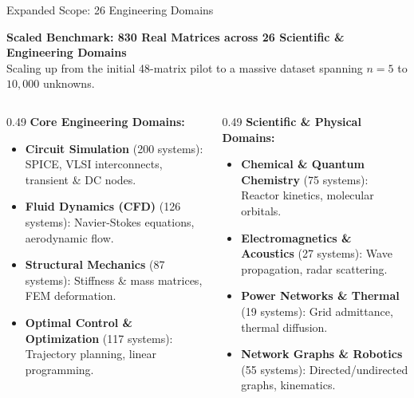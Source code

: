 \documentclass[aspectratio=169,10pt]{beamer}
\begin{document}
\begin{frame}{Expanded Scope: 26 Engineering Domains}
  \vspace{-0.15em}
  \colorbox{LSlightgold}{\parbox{0.98\linewidth}{\vspace{0.25em}
    {\bfseries\normalsize\color{LSnavy} Scaled Benchmark: 830 Real Matrices across 26 Scientific \& Engineering Domains}\\[0.18em]
    {\footnotesize\color{LSgray} Scaling up from the initial 48-matrix pilot to a massive dataset spanning $n = 5$ to $10{,}000$ unknowns.}
    \vspace{0.25em}}}
  \vspace{0.35em}

  \small
  \begin{columns}[T]
    \begin{column}{0.49\textwidth}
      \textbf{\color{LSteal}Core Engineering Domains:}
      \vspace{0.25em}
      \begin{itemize}\setlength\itemsep{0.25em}\footnotesize
        \item \textbf{Circuit Simulation} (200 systems): SPICE, VLSI interconnects, transient \& DC nodes.
        \item \textbf{Fluid Dynamics (CFD)} (126 systems): Navier-Stokes equations, aerodynamic flow.
        \item \textbf{Structural Mechanics} (87 systems): Stiffness \& mass matrices, FEM deformation.
        \item \textbf{Optimal Control \& Optimization} (117 systems): Trajectory planning, linear programming.
      \end{itemize}
    \end{column}

    \begin{column}{0.49\textwidth}
      \textbf{\color{LSteal}Scientific \& Physical Domains:}
      \vspace{0.25em}
      \begin{itemize}\setlength\itemsep{0.25em}\footnotesize
        \item \textbf{Chemical \& Quantum Chemistry} (75 systems): Reactor kinetics, molecular orbitals.
        \item \textbf{Electromagnetics \& Acoustics} (27 systems): Wave propagation, radar scattering.
        \item \textbf{Power Networks \& Thermal} (19 systems): Grid admittance, thermal diffusion.
        \item \textbf{Network Graphs \& Robotics} (55 systems): Directed/undirected graphs, kinematics.
      \end{itemize}
    \end{column}
  \end{columns}


\end{frame}
\end{document}
